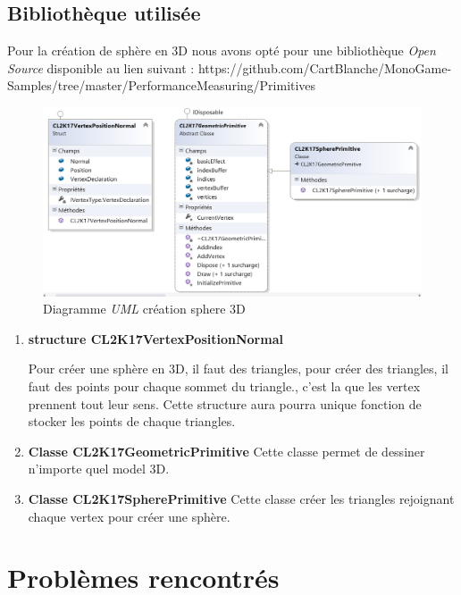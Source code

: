 \documentclass[a4paper,12pt]{article}
\begin{document}
\subsection{Bibliothèque utilisée}

Pour la création de sphère en 3D nous avons opté pour une bibliothèque \emph{Open Source} disponible au lien suivant : https://github.com/CartBlanche/MonoGame-Samples/tree/master/PerformanceMeasuring/Primitives \\

\begin{figure}[htp]
	\centering
	\includegraphics[width=15cm]{./img/diagrammeUmlPrimitive.png}
	\caption{Diagramme \emph{UML} création sphere 3D}
	\label{uml_clcl}
\end{figure}

\begin{enumerate}
    \item \textbf{structure CL2K17VertexPositionNormal}
    
    Pour créer une sphère en 3D, il faut des triangles, pour créer des triangles, il faut des points pour chaque sommet du triangle., c'est la que les vertex prennent tout leur sens. Cette structure aura pourra unique fonction de stocker les points de chaque triangles.
    
    \item \textbf{Classe CL2K17GeometricPrimitive}
    Cette classe permet de dessiner n'importe quel model 3D.
    
    \item \textbf{Classe CL2K17SpherePrimitive}
    Cette classe créer les triangles rejoignant chaque vertex pour créer une sphère.
\end{enumerate}

\newpage

\section{Problèmes rencontrés}
\end{document}
